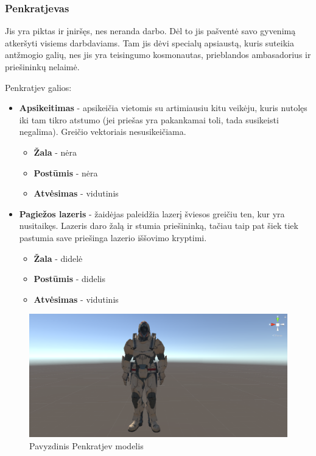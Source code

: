 \documentclass{VUMIFPSkursinis}
\begin{document}
\subsubsection{Penkratjevas}
Jis yra piktas ir įniršęs, nes neranda darbo. Dėl to jis pašventė savo gyvenimą atkeršyti visiems darbdaviams. Tam jis dėvi specialų apsiaustą, kuris suteikia antžmogio galių, nes jis yra teisingumo kosmonautas, prieblandos ambasadorius ir priešininkų nelaimė. 

Penkratjev galios:
\begin{itemize}
    \item \textbf{Apsikeitimas} - apsikeičia vietomis su artimiausiu kitu veikėju, kuris nutolęs iki tam tikro atstumo (jei priešas yra pakankamai toli, tada susikeisti negalima). Greičio vektoriais nesusikeičiama.
    \begin{itemize}
        \item \textbf{Žala} - nėra
        \item \textbf{Postūmis} - nėra
        \item \textbf{Atvėsimas} - vidutinis
    \end{itemize}
    \item \textbf{Pagiežos lazeris} - žaidėjas paleidžia lazerį šviesos greičiu ten, kur yra nusitaikęs. Lazeris daro žalą ir stumia priešininką, tačiau taip pat šiek tiek pastumia save priešinga lazerio iššovimo kryptimi.
    \begin{itemize}
        \item \textbf{Žala} - didelė
        \item \textbf{Postūmis} - didelis
        \item \textbf{Atvėsimas} - vidutinis
    \end{itemize}
\end{itemize}

\begin{figure}[H]
    \centering
    \includegraphics[scale=0.3]{img/Characters/Penkratjevas.png}
    \caption{Pavyzdinis Penkratjev modelis}
    \label{img:penkratjevas}
\end{figure}
\end{document}
